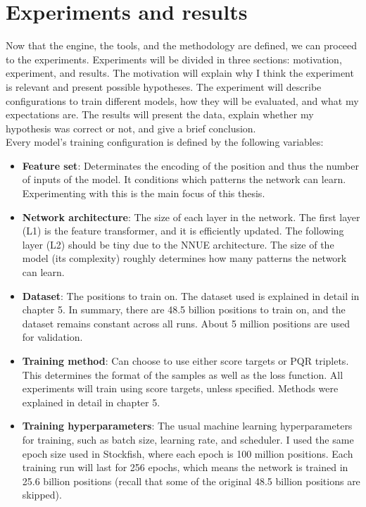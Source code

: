 \newcommand{\depiction}[1]{\parbox{0.7cm}{\texttt{[image: ../assets/depictions/\#1.pdf]}}}
\newcommand{\depictionSM}[1]{\parbox{0.6cm}{\texttt{[image: ../assets/depictions/\#1.pdf]}}}


\section{Experiments and results}

Now that the engine, the tools, and the methodology are defined, we can proceed to the experiments. Experiments will be divided in three sections: motivation, experiment, and results. The motivation will explain why I think the experiment is relevant and present possible hypotheses. The experiment will describe configurations to train different models, how they will be evaluated, and what my expectations are. The results will present the data, explain whether my hypothesis was correct or not, and give a brief conclusion. \\

Every model's training configuration is defined by the following variables:

\begin{itemize}
\item \textbf{Feature set}: Determinates the encoding of the position and thus the number of inputs of the model. It conditions which patterns the network can learn. Experimenting with this is the main focus of this thesis.

\item \textbf{Network architecture}: The size of each layer in the network. The first layer (L1) is the feature transformer, and it is efficiently updated. The following layer (L2) should be tiny due to the NNUE architecture. The size of the model (its complexity) roughly determines how many patterns the network can learn.

\item \textbf{Dataset}: The positions to train on. The dataset used is explained in detail in chapter 5. In summary, there are 48.5 billion positions to train on, and the dataset remains constant across all runs. About 5 million positions are used for validation.

\item \textbf{Training method}: Can choose to use either score targets or PQR triplets. This determines the format of the samples as well as the loss function. All experiments will train using score targets, unless specified. Methods were explained in detail in chapter 5.

\item \textbf{Training hyperparameters}: The usual machine learning hyperparameters for training, such as batch size, learning rate, and scheduler. I used the same epoch size used in Stockfish, where each epoch is 100 million positions. Each training run will last for 256 epochs, which means the network is trained in 25.6 billion positions (recall that some of the original 48.5 billion positions are skipped).
\end{itemize}

